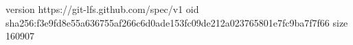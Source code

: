 version https://git-lfs.github.com/spec/v1
oid sha256:f3e9fd8e55a636755af266c6d0ade153fc09de212a023765801e7fc9ba7f7f66
size 160907
